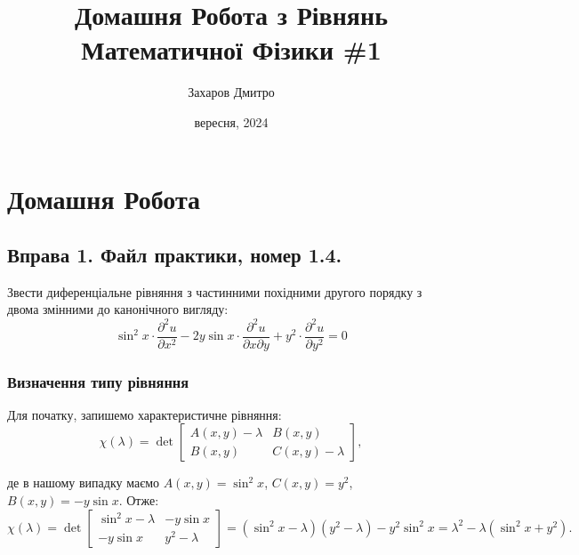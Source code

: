\documentclass{hw_template}
\title{\huge\sffamily\bfseries Домашня Робота з Рівнянь Математичної Фізики \#1}
\author{\Large\sffamily Захаров Дмитро}
\date{\sffamily 15 вересня, 2024}
\begin{document}
\pagestyle{fancy}

\maketitle

\tableofcontents

\pagebreak

\section{Домашня Робота}

\subsection{Вправа 1. Файл практики, номер 1.4.}

\begin{problem}
    Звести диференціальне рівняння з частинними похідними другого порядку з двома змінними до канонічного вигляду:
    \begin{equation*}
        \sin^2 x \cdot \frac{\partial^2 u}{\partial x^2} - 2y \sin x \cdot \frac{\partial^2 u}{\partial x \partial y} + y^2 \cdot \frac{\partial^2 u}{\partial y^2} = 0
    \end{equation*}
\end{problem}

\subsubsection{Визначення типу рівняння}

Для початку, запишемо характеристичне рівняння:
\begin{equation*}
    \chi(\lambda) = \det \begin{bmatrix}
        A(x,y) - \lambda & B(x,y) \\
        B(x,y) & C(x,y) - \lambda
    \end{bmatrix},
\end{equation*}

де в нашому випадку маємо $A(x,y) = \sin^2 x$, $C(x,y) = y^2$, $B(x,y)=-y\sin x$. Отже:
\begin{equation*}
    \chi(\lambda) = \det\begin{bmatrix}
        \sin^2 x - \lambda & -y\sin x \\
        -y\sin x & y^2 - \lambda
    \end{bmatrix} = (\sin^2 x - \lambda)(y^2 - \lambda) - y^2 \sin^2 x = \lambda^2 - \lambda(\sin^2 x + y^2).
\end{equation*}
\end{document}

